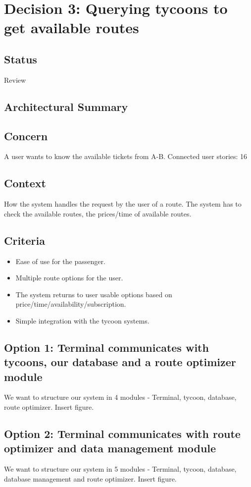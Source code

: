 \section*{Decision 3: Querying tycoons to get available routes}

\subsection*{Status}
Review

\subsection*{Architectural Summary}

\subsection*{Concern}
A user wants to know the available tickets from A-B. 
Connected user stories: 16

\subsection*{Context}
How the system handles the request by the user of a route. The system has to check the available routes, the prices/time of available routes.

\subsection*{Criteria}
\begin{itemize}
\item Ease of use for the passenger.
\item Multiple route options for the user.
\item The system returns to user usable options based on price/time/availability/subscription.
\item Simple integration with the tycoon systems.
\end{itemize}

\subsection*{Option 1: Terminal communicates with tycoons, our database and a route optimizer module}
We want to structure our system in 4 modules - Terminal, tycoon, database, route optimizer.
Insert figure.

\subsection*{Option 2: Terminal communicates with route optimizer and data management module}
We want to structure our system in 5 modules - Terminal, tycoon, database, database management and route optimizer.
Insert figure.

